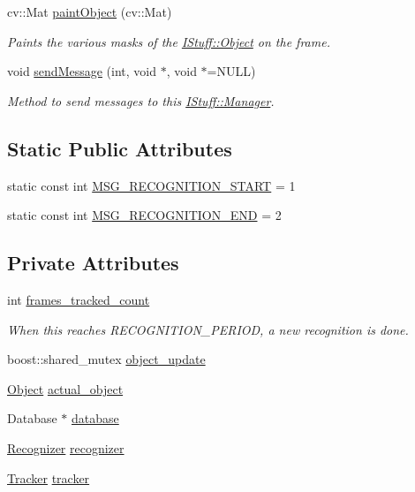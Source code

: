 \begin{DoxyCompactItemize}
cv\-::\-Mat \hyperlink{class_i_stuff_1_1_manager_a5cc4e8151aa21b873786eb8c0742c3d5}{paint\-Object} (cv\-::\-Mat)
\begin{DoxyCompactList}\small\item\em Paints the various masks of the \hyperlink{class_i_stuff_1_1_object}{I\-Stuff\-::\-Object} on the frame. \end{DoxyCompactList}\item 
void \hyperlink{class_i_stuff_1_1_manager_adaef1575710c20ad769c23bb55d2144c}{send\-Message} (int, void $\ast$, void $\ast$=N\-U\-L\-L)
\begin{DoxyCompactList}\small\item\em Method to send messages to this \hyperlink{class_i_stuff_1_1_manager}{I\-Stuff\-::\-Manager}. \end{DoxyCompactList}\end{DoxyCompactItemize}
\subsection*{Static Public Attributes}
\begin{DoxyCompactItemize}
\item 
static const int \hyperlink{class_i_stuff_1_1_manager_af7f9a2cc3c53b7cf351a12f179230da7}{M\-S\-G\-\_\-\-R\-E\-C\-O\-G\-N\-I\-T\-I\-O\-N\-\_\-\-S\-T\-A\-R\-T} = 1
\item 
static const int \hyperlink{class_i_stuff_1_1_manager_a4c465ff50b8eddde0e5fd8b4d3e37bbc}{M\-S\-G\-\_\-\-R\-E\-C\-O\-G\-N\-I\-T\-I\-O\-N\-\_\-\-E\-N\-D} = 2
\end{DoxyCompactItemize}
\subsection*{Private Attributes}
\begin{DoxyCompactItemize}
\item 
int \hyperlink{class_i_stuff_1_1_manager_a3cacb02ece1a4938e7754ad553c91a74}{frames\-\_\-tracked\-\_\-count}
\begin{DoxyCompactList}\small\item\em When this reaches R\-E\-C\-O\-G\-N\-I\-T\-I\-O\-N\-\_\-\-P\-E\-R\-I\-O\-D, a new recognition is done. \end{DoxyCompactList}\item 
boost\-::shared\-\_\-mutex \hyperlink{class_i_stuff_1_1_manager_a9b4234320a01a049bc10f9f13d612fc4}{object\-\_\-update}
\item 
\hyperlink{class_i_stuff_1_1_object}{Object} \hyperlink{class_i_stuff_1_1_manager_a9b898107c919a3ba73f60278c9c05742}{actual\-\_\-object}
\item 
Database $\ast$ \hyperlink{class_i_stuff_1_1_manager_aae57c3ee778cb782dc8dc954a6667c73}{database}
\item 
\hyperlink{class_i_stuff_1_1_recognizer}{Recognizer} \hyperlink{class_i_stuff_1_1_manager_ac039aa2e611b04595e4ff69d3534b4cc}{recognizer}
\item 
\hyperlink{class_i_stuff_1_1_tracker}{Tracker} \hyperlink{class_i_stuff_1_1_manager_a3d313f62a1cfe606098fdcb6f1c748ee}{tracker}
\end{DoxyCompactItemize}
